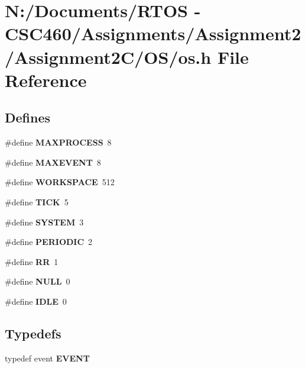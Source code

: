 \section{N:/Documents/RTOS - CSC460/Assignments/Assignment2/Assignment2C/OS/os.h File Reference}
\label{os_8h}
\subsection*{Defines}
\begin{CompactItemize}
\item 
\#define {\bf MAXPROCESS}~8
\item 
\#define {\bf MAXEVENT}~8
\item 
\#define {\bf WORKSPACE}~512
\item 
\#define {\bf TICK}~5
\item 
\#define {\bf SYSTEM}~3
\item 
\#define {\bf PERIODIC}~2
\item 
\#define {\bf RR}~1
\item 
\#define {\bf NULL}~0
\item 
\#define {\bf IDLE}~0
\end{CompactItemize}
\subsection*{Typedefs}
\begin{CompactItemize}
\item 
typedef event {\bf EVENT}
\end{CompactItemize}
